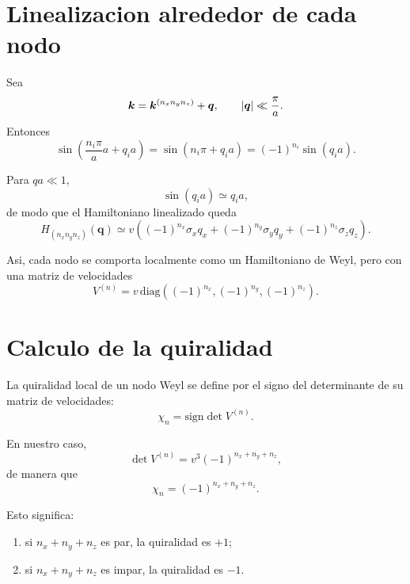 \section{Linealizacion alrededor de cada nodo}
Sea
\begin{equation}
\bm{k}=\bm{k}^{(n_x n_y n_z)}+\bm{q},
\qquad
\abs{\bm{q}}\ll \frac{\pi}{a}.
\end{equation}
Entonces
\begin{equation}
\sin\!\left(\frac{n_i\pi}{a}a + q_i a\right)
=
\sin(n_i\pi + q_i a)
=
(-1)^{n_i}\sin(q_i a).
\end{equation}

Para \(qa\ll 1\),
\begin{equation}
\sin(q_i a)\simeq q_i a,
\end{equation}
de modo que el Hamiltoniano linealizado queda
\begin{equation}
H_{(n_x n_y n_z)}(\bm{q})
\simeq
v\left(
(-1)^{n_x}\sigma_x q_x +
(-1)^{n_y}\sigma_y q_y +
(-1)^{n_z}\sigma_z q_z
\right).
\label{c27:eq:linearized}
\end{equation}

Asi, cada nodo se comporta localmente como un Hamiltoniano de Weyl, pero con una matriz de velocidades
\begin{equation}
V^{(n)}=
v\,
\mathrm{diag}\!\left(
(-1)^{n_x},
(-1)^{n_y},
(-1)^{n_z}
\right).
\end{equation}

\section{Calculo de la quiralidad}
La quiralidad local de un nodo Weyl se define por el signo del determinante de su matriz de velocidades:
\begin{equation}
\chi_n = \mathrm{sign}\det V^{(n)}.
\label{c27:eq:chirdef}
\end{equation}

En nuestro caso,
\begin{equation}
\det V^{(n)}
=
v^3(-1)^{n_x+n_y+n_z},
\end{equation}
de manera que
\begin{equation}
\boxed{
\chi_n = (-1)^{n_x+n_y+n_z}.
}
\label{c27:eq:chirality}
\end{equation}

Esto significa:
\begin{enumerate}[label=\arabic*.]
    \item si \(n_x+n_y+n_z\) es par, la quiralidad es \(+1\);
    \item si \(n_x+n_y+n_z\) es impar, la quiralidad es \(-1\).
\end{enumerate}

